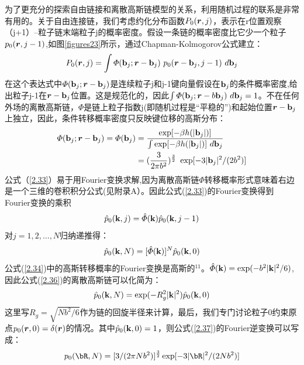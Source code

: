 为了更充分的探索自由链接和离散高斯链模型的关系，利用随机过程的联系是非常有用的。关于自由连接链，我们考虑约化分布函数$P_{0}(\bm{r},j)$，表示在r位置观察（j+1）--粒子链末端粒子j的概率密度。假设一条链的概率密度比它少一个粒子$p_{0}(\bm{r},j-1)$,如图\ref{figures23}所示，通过Chapman-Kolmogorov公式建立：
\begin{equation}\label{2.33}
P_{0}(\bm{r},j)=\int  \varPhi (\mathbf{b}_{j};\bm{r}-\mathbf{b}_{j})~p_{0}(\bm{r}-\mathbf{b}_{j},j-1)~d\mathbf{b}_{j}
\end{equation}
在这个表达式中$\varPhi (\mathbf{b}_{j};\bm{r}-\mathbf{b}_{j})$是连续粒子j和j-1键向量假设在$\mathbf{b}_{j}$的条件概率密度,给出粒子j-1在$\bm{r}-\mathbf{b}_{j}$位置。这是规范化的，因此$\int  \varPhi (\mathbf{b}_{j};\bm{r}-b\mathbf{b}_{j})~d\mathbf{b}_{j}=1$。不在任何外场的离散高斯链，$\varPhi$是链上粒子指数j(即随机过程是“平稳的”)和起始位置$\bm{r}-\mathbf{b}_{j}$上独立，因此，条件转移概率密度只反映键位移的高斯分布：
\begin{equation}\label{2.34}
\begin{aligned}
\varPhi(\mathbf{b}_{j};\bm{r}-\mathbf{b}_{j})=\varPhi(\mathbf{b}_{j})&=\frac{\exp[-\beta h(|\mathbf{b}_{j}|)]}{\int \exp[-\beta h(|\mathbf{b}_{j}|)]~d\mathbf{b}_{j}} \\ &=(\frac{3}{2 \pi b^2})^{\frac{3}{2}}~\exp[-3|\mathbf{b}_{j}|^2 / (2b^2)]
\end{aligned}
\end{equation}
公式（\ref{2.33}）易于用Fourier变换求解,因为离散高斯链$\varPhi$转移概率形式意味着右边是一个三维的卷积积分公式(见附录A）。因此公式(\ref{2.33})的Fourier变换得到Fourier变换的乘积
\begin{equation}\label{2.35}
\hat{p}_{0}(\mathbf{k},j)=\hat{\varPhi}(\mathbf{k})\hat{p}_{0}(\mathbf{k},j-1)
\end{equation}
对$j=1,2,\dots ,N$归纳递推得：
\begin{equation}\label{2.36}
\hat{p}_{0}(\mathbf{k},N)=[\hat{\varPhi}(\mathbf{k})]^N\hat{p}_{0}(\mathbf{k},0)
\end{equation}
公式(\ref{2.34})中的高斯转移概率的Fourier变换是高斯的$^{11}$。$\hat{\varPhi}(\mathbf{k})=\exp(-b^2|\mathbf{k}|^2/6)$,因此公式(\ref{2.36})的离散高斯链可以化简为：
\begin{equation}\label{2.37}
\hat{p}_{0}(\mathbf{k},N)=\exp(-R_{g}^2|\mathbf{k}|^2)\hat{p}_{0}(\mathbf{k},0)
\end{equation}
这里写$R_{g}=\sqrt{Nb^2/6}$作为链的回旋半径来计算，最后，我们专门讨论粒子0约束原点$p_{0}(\bm{r},0)=\delta(\bm{r})$的情况。其中$\hat{p}_{0}(\mathbf{k},0)=1$，则公式(\ref{2.37})的Fourier逆变换可以写成：
\begin{equation}\label{2.38}
p_{0}(\bR,N)=[3/(2\pi Nb^2)]^\frac{3}{2}\exp[-3|\bR|^2/(2Nb^2)]
\end{equation}

